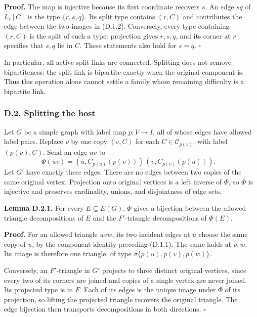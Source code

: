 \documentclass[english,11pt,a4paper]{article}
\begin{document}
\textbf{Proof.} The map is injective because its first coordinate recovers \(s\). An edge \(sq\) of \(L_r[C]\) is the type \(\{r,s,q\}\). Its split type contains \((r,C)\) and contributes the edge between the two images in (D.1.2). Conversely, every type containing \((r,C)\) is the split of such a type: projection gives \(r,s,q\), and its corner at \(r\) specifies that \(s,q\) lie in \(C\). These statements also hold for \(s=q\). \(\square\)

In particular, all active split links are connected. Splitting does not remove bipartiteness: the split link is bipartite exactly when the original component is. Thus this operation alone cannot settle a family whose remaining difficulty is a bipartite link.

\subsubsection{D.2. Splitting the host}\label{d.2.-splitting-the-host}

Let \(G\) be a simple graph with label map \(p:V\to I\), all of whose edges have allowed label pairs. Replace \(v\) by one copy \((v,C)\) for each \(C\in\mathcal C_{p(v)}\), with label \((p(v),C)\). Send an edge \(uv\) to \[\Phi(uv)=
(u,C_{p(u)}(p(v)))\,(v,C_{p(v)}(p(u))).
\tag{D.2.1}\] Let \(G'\) have exactly these edges. There are no edges between two copies of the same original vertex. Projection onto original vertices is a left inverse of \(\Phi\), so \(\Phi\) is injective and preserves cardinality, unions, and disjointness of edge sets.

\textbf{Lemma D.2.1.} For every \(E\subseteq E(G)\), \(\Phi\) gives a bijection between the allowed triangle decompositions of \(E\) and the \(F'\)-triangle decompositions of \(\Phi(E)\).

\textbf{Proof.} For an allowed triangle \(uvw\), its two incident edges at \(u\) choose the same copy of \(u\), by the component identity preceding (D.1.1). The same holds at \(v,w\). Its image is therefore one triangle, of type \(\sigma\{p(u),p(v),p(w)\}\).

Conversely, an \(F'\)-triangle in \(G'\) projects to three distinct original vertices, since every two of its corners are joined and copies of a single vertex are never joined. Its projected type is in \(F\). Each of its edges is the unique image under \(\Phi\) of its projection, so lifting the projected triangle recovers the original triangle. The edge bijection then transports decompositions in both directions. \(\square\)
\end{document}

